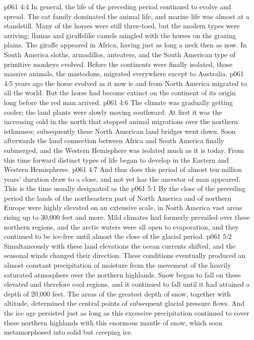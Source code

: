 \vs p061 4:4 In general, the life of the preceding period continued to evolve and spread. The cat family dominated the animal life, and marine life was almost at a standstill. Many of the horses were still three\hyp{}toed, but the modern types were arriving; llamas and giraffelike camels mingled with the horses on the grazing plains. The giraffe appeared in Africa, having just as long a neck then as now. In South America sloths, armadillos, anteaters, and the South American type of primitive monkeys evolved. Before the continents were finally isolated, those massive animals, the mastodons, migrated everywhere except to Australia.
\vs p061 4:5 \pc {} years ago the horse evolved as it now is and from North America migrated to all the world. But the horse had become extinct on the continent of its origin long before the red man arrived.
\vs p061 4:6 The climate was gradually getting cooler; the land plants were slowly moving southward. At first it was the increasing cold in the north that stopped animal migrations over the northern isthmuses; subsequently these North American land bridges went down. Soon afterwards the land connection between Africa and South America finally submerged, and the Western Hemisphere was isolated much as it is today. From this time forward distinct types of life began to develop in the Eastern and Western Hemispheres.
\vs p061 4:7 \pc And thus does this period of almost ten million years’ duration draw to a close, and not yet has the ancestor of man appeared. This is the time usually designated as the 
\vs p061 5:1 By the close of the preceding period the lands of the northeastern part of North America and of northern Europe were highly elevated on an extensive scale, in North America vast areas rising up to 30,000 feet and more. Mild climates had formerly prevailed over these northern regions, and the arctic waters were all open to evaporation, and they continued to be ice\hyp{}free until almost the close of the glacial period.
\vs p061 5:2 Simultaneously with these land elevations the ocean currents shifted, and the seasonal winds changed their direction. These conditions eventually produced an almost constant precipitation of moisture from the movement of the heavily saturated atmosphere over the northern highlands. Snow began to fall on these elevated and therefore cool regions, and it continued to fall until it had attained a depth of 20,000 feet. The areas of the greatest depth of snow, together with altitude, determined the central points of subsequent glacial pressure flows. And the ice age persisted just as long as this excessive precipitation continued to cover these northern highlands with this enormous mantle of snow, which soon metamorphosed into solid but creeping ice.
